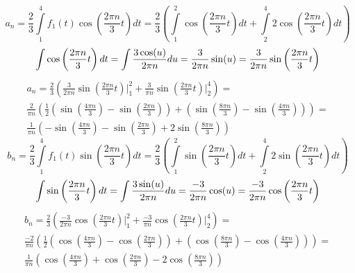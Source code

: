 \begin{equation}
    a_n = \frac{2}{3} \int\limits_{1}^{4} f_1(t) \cos\left( \frac{2\pi n}{3} t\right) dt = \frac{2}{3} \left( \int\limits_{1}^{2} \cos\left( \frac{2\pi n}{3} t\right) dt + \int\limits_{2}^{4} 2 \cos\left( \frac{2\pi n}{3} t\right) dt \right) 
\end{equation}
\begin{equation}
    \int \cos\left( \frac{2\pi n}{3} t \right) dt = \int \frac{3\cos(u)}{2\pi n}du = \frac{3}{2\pi n } \sin(u) = \frac{3}{2\pi n } \sin\left( \frac{2\pi n}{3} t \right)
    \notag
 \end{equation}
\begin{multline}
    a_n = \frac{2}{3} \left( \frac{3}{2\pi n } \sin\left( \frac{2\pi n}{3} t \right) \Big|_{1}^{2}  + \frac{3}{\pi n } \sin\left( \frac{2\pi n}{3} t \right) \Big|_2^4 \right) = \\ 
    \frac{2}{\pi n} \left( \frac{1}{2} \left( \sin\left(\frac{4\pi n}{3}\right) - \sin\left(\frac{2\pi n}{3}\right) \right) + \left(\sin\left(\frac{8\pi n}{3}\right)  - \sin\left(\frac{4\pi n}{3}\right)  \right) \right) = \\
    \frac{1}{\pi n}\left(-\sin\left( \frac{4\pi n}{3}\right) - \sin\left(\frac{2\pi n}{3} \right) + 2\sin\left(\frac{8\pi n}{3}\right)\right)
\end{multline}
\begin{equation}
    b_n = \frac{2}{3} \int\limits_{1}^{4} f_1(t) \sin\left( \frac{2\pi n}{3} t\right) dt = \frac{2}{3} \left( \int\limits_{1}^{2} \sin\left( \frac{2\pi n}{3} t\right) dt + \int\limits_{2}^{4} 2 \sin\left( \frac{2\pi n}{3} t\right) dt \right) 
\end{equation}
\begin{equation}
    \int \sin\left( \frac{2\pi n}{3} t \right) dt = \int \frac{3\sin(u)}{2\pi n}du = \frac{-3}{2\pi n } \cos(u) = \frac{-3}{2\pi n } \cos\left( \frac{2\pi n}{3} t \right)
    \notag
 \end{equation}
\begin{multline}
    b_n = \frac{2}{3} \left( \frac{-3}{2\pi n } \cos\left( \frac{2\pi n}{3} t \right) \Big|_{1}^{2}  + \frac{-3}{\pi n } \cos\left( \frac{2\pi n}{3} t \right) \Big|_2^4 \right) = \\ 
    \frac{-2}{\pi n} \left( \frac{1}{2} \left( \cos\left(\frac{4\pi n}{3}\right) - \cos\left(\frac{2\pi n}{3}\right) \right) + \left(\cos\left(\frac{8\pi n}{3}\right)  - \cos\left(\frac{4\pi n}{3}\right)  \right) \right) = \\
    \frac{1}{\pi n}\left(\cos\left( \frac{4\pi n}{3}\right) + \cos\left(\frac{2\pi n}{3} \right) - 2\cos\left(\frac{8\pi n}{3}\right)\right)
\end{multline}
